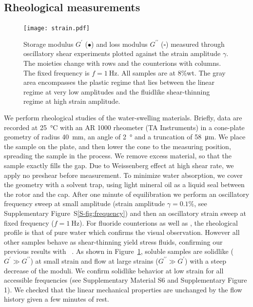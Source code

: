 \documentclass[journal=jacsat,manuscript=article]{achemso}
\begin{document}

\subsection{Rheological measurements}
\begin{figure}[t]
\texttt{[image: strain.pdf]}%
\caption{Storage modulus $G^\prime$ ($\bullet$) and loss modulus $G^{\prime\prime}$ ($\square$) measured through oscillatory shear experiments plotted against the strain amplitude $\gamma$. The moieties change with rows and the counterions with columns. The fixed frequency is $f=\SI{1}{\hertz}$. All samples are at 8\%wt. The gray area encompasses the plastic regime that lies between the linear regime at very low amplitudes and the fluidlike shear-thinning regime at high strain amplitude.}%
\label{fig:strain}%
\end{figure}

We perform rheological studies of the water-swelling materials. Briefly, data are recorded at \SI{25}{\celsius} with an AR 1000 rheometer (TA Instruments) in a cone-plate geometry of radius \SI{40}{\milli\metre}, an angle of \SI{2}{\degree} and a truncation of \SI{58}{\micro\metre}\cite{Macosko1994,Larson1999}. We place the sample on the plate, and then lower the cone to the measuring position, spreading the sample in the process. We remove excess material, so that the sample exactly fills the gap. Due to Weissenberg effect at high shear rate, we apply no preshear before measurement. To minimize water absorption, we cover the geometry with a solvent trap, using light mineral oil as a liquid seal between the rotor and the cap. After one minute of equilibration we perform an oscillatory frequency sweep at small amplitude (strain amplitude $\gamma=0.1\%$, see Supplementary Figure~S\ref{S-fig:frequency}) and then an oscillatory strain sweep at fixed frequency ($f=\SI{1}{\hertz}$). For fluoride counterions as well as , the rheological profile is that of pure water which confirms the visual observation. However all other samples behave as shear-thinning yield stress fluids, confirming our previous results with ~\cite{Srour2014}. As shown in Figure~\ref{fig:strain}, soluble samples are solidlike ($G^\prime \gg G^{\prime\prime}$) at small strain and flow at large strains ($G^{\prime\prime} \gg G^\prime$) with a steep decrease of the moduli. We confirm solidlike behavior at low strain for all accessible frequencies (see Supplementary Material S6 and Supplementary Figure 1). We checked that the linear mechanical properties are unchanged by the flow history given a few minutes of rest.
\end{document}
